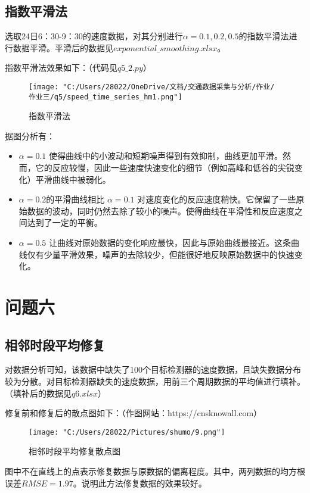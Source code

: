 \documentclass[withoutpreface,bwprint]{cumcmthesis} %
\begin{document}
    \subsection{指数平滑法}
    选取24日6：30-9：30的速度数据，对其分别进行$\alpha =0.1,0.2,0.5$的指数平滑法进行数据平滑。平滑后的数据见$exponential\_smoothing.xlsx$。\par
    指数平滑法效果如下：（代码见$q5\_2.py$）\par
    \begin{figure}[!htbp] 
        \centering
        \texttt{[image: "C:/Users/28022/OneDrive/文档/交通数据采集与分析/作业/作业三/q5/speed\_time\_series\_hm1.png"]}
        \caption{指数平滑法}
        \label{fig:your_label}
    \end{figure}\par
    据图分析有：\par
    \begin{itemize}
        \item $\alpha =0.1$ 使得曲线中的小波动和短期噪声得到有效抑制，曲线更加平滑。然而，它的反应较慢，因此一些速度快速变化的细节（例如高峰和低谷的尖锐变化）平滑曲线中被弱化。
        \item $\alpha =0.2$的平滑曲线相比 $\alpha =0.1$ 对速度变化的反应速度稍快。它保留了一些原始数据的波动，同时仍然去除了较小的噪声。使得曲线在平滑性和反应速度之间达到了一定的平衡。
        \item $\alpha =0.5$ 让曲线对原始数据的变化响应最快，因此与原始曲线最接近。这条曲线仅有少量平滑效果，噪声的去除较少，但能很好地反映原始数据中的快速变化。
    \end{itemize}

    \section{问题六}
        \subsection{相邻时段平均修复}
        对数据分析可知，该数据中缺失了100个目标检测器的速度数据，且缺失数据分布较为分散。对目标检测器缺失的速度数据，用前三个周期数据的平均值进行填补。（填补后的数据见$q6.xlsx$）\par
        修复前和修复后的散点图如下：（作图网站：https://cnsknowall.com）\par
        \begin{figure}[!htbp] 
            \centering
            \texttt{[image: "C:/Users/28022/Pictures/shumo/9.png"]}
            \caption{相邻时段平均修复散点图}
            \label{fig:your_label}
        \end{figure}\par
        图中不在直线上的点表示修复数据与原数据的偏离程度。其中，两列数据的均方根误差$RMSE=1.97$。说明此方法修复数据的效果较好。
\end{document}
